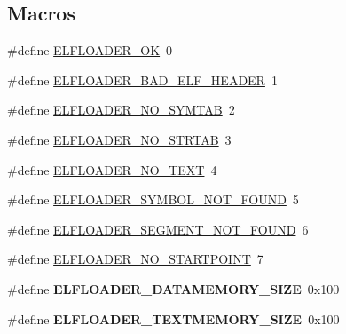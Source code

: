 \subsection*{Macros}
\begin{DoxyCompactItemize}
\item 
\#define \hyperlink{group__elfloader_ga8079bf9400f6ab6ea2bcbb02619bf642}{E\+L\+F\+L\+O\+A\+D\+E\+R\+\_\+\+O\+K}~0
\item 
\#define \hyperlink{group__elfloader_gadc23fd3bb068baab21e0719f5272f5f4}{E\+L\+F\+L\+O\+A\+D\+E\+R\+\_\+\+B\+A\+D\+\_\+\+E\+L\+F\+\_\+\+H\+E\+A\+D\+E\+R}~1
\item 
\#define \hyperlink{group__elfloader_ga1f5f088314c4af0fe4889c5f282b07f1}{E\+L\+F\+L\+O\+A\+D\+E\+R\+\_\+\+N\+O\+\_\+\+S\+Y\+M\+T\+A\+B}~2
\item 
\#define \hyperlink{group__elfloader_ga75a62386c75729c352ecf37de87121cc}{E\+L\+F\+L\+O\+A\+D\+E\+R\+\_\+\+N\+O\+\_\+\+S\+T\+R\+T\+A\+B}~3
\item 
\#define \hyperlink{group__elfloader_ga8b8819f1e0118bf282c0097beb3d5570}{E\+L\+F\+L\+O\+A\+D\+E\+R\+\_\+\+N\+O\+\_\+\+T\+E\+X\+T}~4
\item 
\#define \hyperlink{group__elfloader_ga2a128ca398d9ab5d2ad49e298c81f278}{E\+L\+F\+L\+O\+A\+D\+E\+R\+\_\+\+S\+Y\+M\+B\+O\+L\+\_\+\+N\+O\+T\+\_\+\+F\+O\+U\+N\+D}~5
\item 
\#define \hyperlink{group__elfloader_ga48634066def7d19e02812e360e074ccf}{E\+L\+F\+L\+O\+A\+D\+E\+R\+\_\+\+S\+E\+G\+M\+E\+N\+T\+\_\+\+N\+O\+T\+\_\+\+F\+O\+U\+N\+D}~6
\item 
\#define \hyperlink{group__elfloader_ga98dc2983b4456dc3484f1144347da8d2}{E\+L\+F\+L\+O\+A\+D\+E\+R\+\_\+\+N\+O\+\_\+\+S\+T\+A\+R\+T\+P\+O\+I\+N\+T}~7
\item 
\hypertarget{group__elfloader_ga9cca0b1cd724e509effb0c07f235d65d}{}\#define {\bfseries E\+L\+F\+L\+O\+A\+D\+E\+R\+\_\+\+D\+A\+T\+A\+M\+E\+M\+O\+R\+Y\+\_\+\+S\+I\+Z\+E}~0x100\label{group__elfloader_ga9cca0b1cd724e509effb0c07f235d65d}

\item 
\hypertarget{group__elfloader_gaa356f95a6de8f4a40fe6b51a26543b00}{}\#define {\bfseries E\+L\+F\+L\+O\+A\+D\+E\+R\+\_\+\+T\+E\+X\+T\+M\+E\+M\+O\+R\+Y\+\_\+\+S\+I\+Z\+E}~0x100\label{group__elfloader_gaa356f95a6de8f4a40fe6b51a26543b00}

\end{DoxyCompactItemize}
